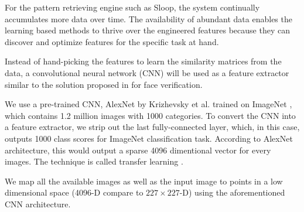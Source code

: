 For the pattern retrieving engine such as Sloop, the system continually accumulates more data over time. The availability of abundant data enables the learning based methods to thrive over the engineered features because they can discover and optimize features for the specific task at hand.

Instead of hand-picking the features to learn the similarity matrices from the data, a convolutional neural network (CNN) will be used as a feature extractor similar to the solution proposed in \cite{chopra05} for face verification.

We use a pre-trained CNN, AlexNet by Krizhevsky et al. \cite{kriz12} trained on ImageNet \cite{imagenet}, which contains 1.2 million images with 1000 categories. To convert the CNN into a feature extractor, we strip out the last fully-connected layer, which, in this case, outputs 1000 class scores for ImageNet classification task. According to AlexNet architecture, this would output a sparse 4096 dimentional vector for every images. The technique is called transfer learning \cite{transfer}.

We map all the available images as well as the input image to points in a low dimensional space (4096-D compare to $227 \times 227$-D) using the aforementioned CNN architecture. 

